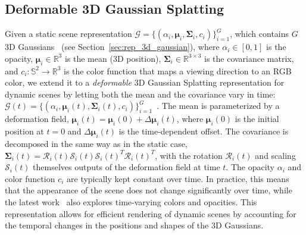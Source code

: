 \subsection{Deformable 3D Gaussian Splatting}
\label{sec:rep_4d_gaussian}
Given a static scene representation $\mathcal{G}=\{(\alpha_i, \boldsymbol{\mu}_i, \boldsymbol{\Sigma}_i, c_i)\}_{i=1}^G$, which contains $G$ 3D Gaussians~\cite{kerbl20233d} (see Section~\ref{sec:rep_3d_gaussian}),
where $\alpha_i \in [0, 1]$ is the opacity, $\boldsymbol{\mu}_i\in\mathbb{R}^3$ is the mean (3D position), $\boldsymbol{\Sigma}_i\in\mathbb{R}^{3\times 3}$ is the covariance matrix, and $c_i: \mathbb{S}^2 \rightarrow \mathbb{R}^3$ is the color function that maps a viewing direction to an RGB color, we extend it to a \emph{deformable} 3D Gaussian Splatting representation for dynamic scenes by letting both the mean and the covariance vary in time: $\mathcal{G}(t)=\{(\alpha_i, \boldsymbol{\mu}_i(t), \boldsymbol{\Sigma}_i(t), c_i)\}_{i=1}^G$~\cite{wu20244d}.
The mean is parameterized by a deformation field, $\boldsymbol{\mu}_i(t)=\boldsymbol{\mu}_i(0)+\Delta\boldsymbol{\mu}_i(t)$, where $\boldsymbol{\mu}_i(0)$ is the initial position at $t=0$ and $\Delta\boldsymbol{\mu}_i(t)$ is the time-dependent offset.
The covariance is decomposed in the same way as in the static case, $\boldsymbol{\Sigma}_i(t)=\mathcal{R}_i(t)\mathcal{S}_i(t)\mathcal{S}_i(t)^{T}\mathcal{R}_i(t)^{T}$, with the rotation $\mathcal{R}_i(t)$ and scaling $\mathcal{S}_i(t)$ themselves outputs of the deformation field at time $t$.
The opacity $\alpha_i$ and color function $c_i$ are typically kept constant over time.
In practice, this means that the appearance of the scene does not change significantly over time, while the latest work~\cite{zhang2025gaussian} also explores time-varying colors and opacities.
This representation allows for efficient rendering of dynamic scenes by accounting for the temporal changes in the positions and shapes of the 3D Gaussians.